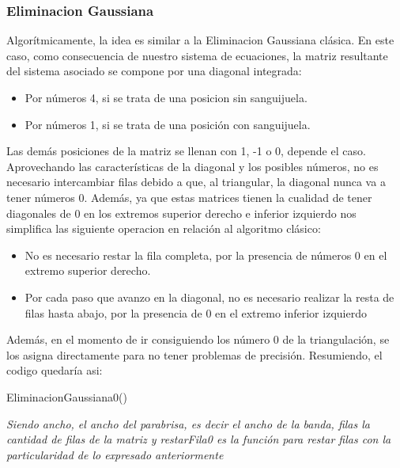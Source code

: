     


\subsubsection{Eliminacion Gaussiana}
Algorítmicamente, la idea es similar a la Eliminacion Gaussiana clásica. En este caso, como consecuencia de nuestro sistema de ecuaciones, la matriz resultante del sistema asociado se compone por una diagonal integrada:
\begin{itemize}
\item Por números 4, si se trata de una posicion sin sanguijuela.
\item Por números 1, si se trata de una posición con sanguijuela.
\end{itemize}

Las demás posiciones de la matriz se llenan con 1, -1 o 0, depende el caso.\\ 
Aprovechando las características de la diagonal y los posibles números, no es necesario intercambiar filas debido a que, al triangular, la diagonal nunca va a tener números 0. Además, ya que estas matrices tienen la cualidad de tener diagonales de 0 en los extremos superior derecho e inferior izquierdo nos simplifica las siguiente operacion en relación al algoritmo clásico:

\begin{itemize}
\item No es necesario restar la fila completa, por la presencia de números 0 en el extremo superior derecho.
\item Por cada paso que avanzo en la diagonal, no es necesario realizar la resta de filas hasta abajo, por la presencia de 0 en el extremo inferior izquierdo  
\end{itemize}

Además, en el momento de ir consiguiendo los número 0 de la triangulación, se los asigna directamente para no tener problemas de precisión. Resumiendo, el codigo quedaría asi:\\
 \begin{algorithm}[H]
\caption{EliminacionGaussiana0()}
\begin{algorithmic}[1]

    
    $}
    
        \State coeficiente = (Obtener(i,j)/Obtener(j,j));
		\State RestarFila0(coeficiente, j, i, j+1);
		
	\EndFor 
    \State cerosAIzquierda(j,j);
	
	\EndFor
	
\end{algorithmic}
\end{algorithm}
\textit{Siendo ancho, el ancho del parabrisa, es decir el ancho de la banda, filas la cantidad de filas de la matriz y restarFila0 es la función para restar filas con la particularidad de lo expresado anteriormente}
	
